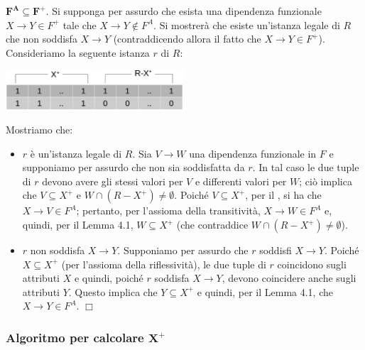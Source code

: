 $\mathbf{F^A \boldsymbol{\subseteq} F^{\boldsymbol{+}}}$. Si supponga per assurdo che esista una dipendenza 
funzionale $X \rightarrow Y \in F^+$ tale che $X \rightarrow Y \not\in F^A$. Si mostrerà che esiste 
un’istanza legale di $R$ che non soddisfa $X \rightarrow Y$ (contraddicendo allora il fatto che $X \rightarrow Y 
\in F^+$).\\
Consideriamo la seguente istanza $r$ di $R$:
\begin{center}
\includegraphics[width=250px]{img_4_4_2.eps} 
\end{center}
Mostriamo che:
\begin{itemize}
 \item $r$ è un’istanza legale di $R$. Sia $V \rightarrow W$ una dipendenza funzionale in $F$ e supponiamo
 per assurdo che non sia soddisfatta da $r$. In tal caso le due tuple di $r$ devono avere gli stessi valori
 per $V$ e differenti valori per $W$; ciò implica che $V \subseteq X^+$ e $W \cap (R-X^+)\not = \emptyset$.
 Poiché $V \subseteq X^+$, per il , si ha che $X \rightarrow V \in F^A$; pertanto,
 per l’assioma della transitività, $X \rightarrow W \in F^A$ e, quindi, per il Lemma 4.1,
 $W \subseteq X^+$ (che contraddice $W \cap (R-X^+)\not =\emptyset$).
 \item $r$ non soddisfa $X \rightarrow Y$. Supponiamo per assurdo che $r$ soddisfi $X \rightarrow Y$. Poiché 
 $X \subseteq X^+$ (per l’assioma della riflessività), le due tuple di $r$ coincidono sugli attributi $X$ 
 e quindi, poiché $r$ soddisfa $X \rightarrow Y$, devono coincidere anche sugli attributi $Y$. Questo implica
 che $Y \subseteq X^+$ e quindi, per il Lemma 4.1, che $X \rightarrow Y \in F^A$. $\Box$
\end{itemize}

\subsubsection{Algoritmo per calcolare $\mathbf{X^{\boldsymbol{+}}}$}


